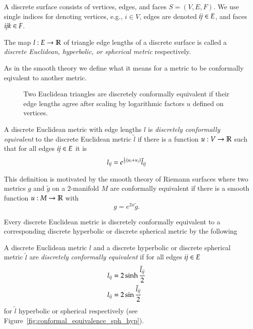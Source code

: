 \documentclass[Thesis.tex]{subfiles}
\begin{document}
A discrete surface consists of vertices, edges, and faces $S=(V, E, F)$. We use single indices for denoting vertices, e.g., $i \in V$, edges are denoted $\it{ij}\in E$, and faces $\it{ijk}\in F$.

\begin{definition}
The map $l:E\to \mathbb R$ of triangle edge lengths of a discrete surface is called a \emph{discrete Euclidean, hyperbolic, or spherical metric} respectively.
\end{definition}

As in the smooth theory we define what it means for a metric to be conformally eqivalent to another metric. 

\begin{figure}
\centering
\scalebox{0.5}{}
\caption[Euclidean conformal equivalence]{Two Euclidean triangles are discretely conformally equivalent if their edge lengths agree after scaling by logarithmic factors $u$ defined on vertices.}
\label{fig:conformal_equivalence}
\end{figure}

\begin{definition}
\label{def:conformal_equivalence_euclidean}
A discrete Euclidean metric with edge lengths $l$ is \emph{discretely conformally equivalent} to the discrete Euclidean metric $\tilde l$ if there is a function $u:V\to \mathbb R$ such that for all edges $\it{ij}\in E$ it is
\begin{equation}
l_{\it{ij}} = e^{\frac{1}{2}(u_i + u_j)}\tilde l_{\it{ij}} \label{eq:euclidean_equivalence}
\end{equation}
\end{definition}

This definition is motivated by the smooth theory of Riemann surfaces where two metrics $g$ and $\tilde g$ on a $2$-manifold $M$ are conformally equivalent if there is a smooth function $u:M\to \mathbb R$ with \[g=e^{2u}\tilde g.\]

Every discrete Euclidean metric is discretely conformally equivalent to a corresponding discrete hyperbolic or discrete spherical metric by the following

\begin{definition}
\label{def:conformal_equivalence_general}
A discrete Euclidean metric $l$ and a discrete hyperbolic or discrete spherical metric $\tilde l$ are \emph{discretely conformally equivalent} if for all edges $\it{ij}\in E$
\begin{align}
l_{\it{ij}} &= 2\sinh \frac{\tilde l_{\it{ij}}}{2} \label{eq:hyperbolic_equivalence}\\
l_{\it{ij}} &= 2\sin \frac{\tilde l_{\it{ij}}}{2} \label{eq:spherical_equivalence}
\end{align}
for $\tilde l$ hyperbolic or spherical respectively (see Figure~\ref{fig:conformal_equivalence_sph_hyp}).
\end{definition}
\end{document}
